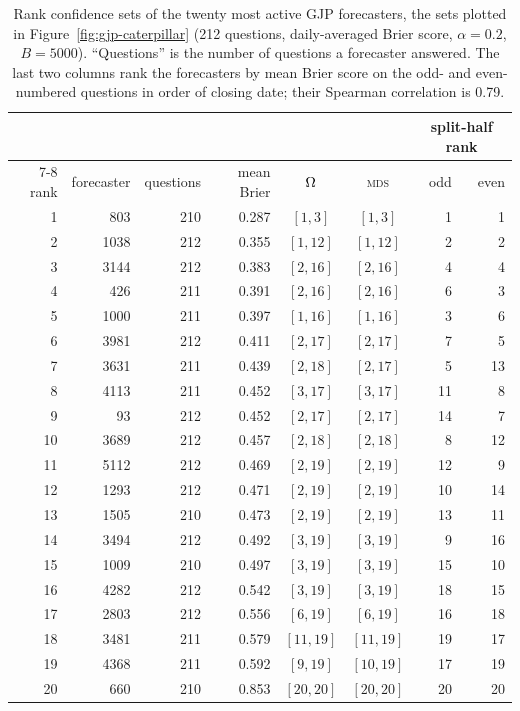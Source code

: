 \begin{table}[htb]
  \centering
  \caption[GJP: all rank sets]{Rank confidence sets of the twenty most active GJP forecasters, the sets plotted in Figure~\ref{fig:gjp-caterpillar} (212 questions, daily-averaged Brier score, $\alpha=0.2$, $B=5000$). ``Questions'' is the number of questions a forecaster answered. The last two columns rank the forecasters by mean Brier score on the odd- and even-numbered questions in order of closing date; their Spearman correlation is 0.79.}
  \label{tab:app-gjp}
  \small
  \begin{tabular}{rrrrccrr}
    \toprule
    & & & & & & \multicolumn{2}{c}{split-half rank}\\
    \cmidrule(lr){7-8}
    rank & forecaster & questions & mean Brier & $\Omega$ & \textsc{mds} & odd & even\\
    \midrule
    1 & 803 & 210 & 0.287 & $[1,3]$ & $[1,3]$ & 1 & 1\\
    2 & 1038 & 212 & 0.355 & $[1,12]$ & $[1,12]$ & 2 & 2\\
    3 & 3144 & 212 & 0.383 & $[2,16]$ & $[2,16]$ & 4 & 4\\
    4 & 426 & 211 & 0.391 & $[2,16]$ & $[2,16]$ & 6 & 3\\
    5 & 1000 & 211 & 0.397 & $[1,16]$ & $[1,16]$ & 3 & 6\\
    6 & 3981 & 212 & 0.411 & $[2,17]$ & $[2,17]$ & 7 & 5\\
    7 & 3631 & 211 & 0.439 & $[2,18]$ & $[2,17]$ & 5 & 13\\
    8 & 4113 & 211 & 0.452 & $[3,17]$ & $[3,17]$ & 11 & 8\\
    9 & 93 & 212 & 0.452 & $[2,17]$ & $[2,17]$ & 14 & 7\\
    10 & 3689 & 212 & 0.457 & $[2,18]$ & $[2,18]$ & 8 & 12\\
    11 & 5112 & 212 & 0.469 & $[2,19]$ & $[2,19]$ & 12 & 9\\
    12 & 1293 & 212 & 0.471 & $[2,19]$ & $[2,19]$ & 10 & 14\\
    13 & 1505 & 210 & 0.473 & $[2,19]$ & $[2,19]$ & 13 & 11\\
    14 & 3494 & 212 & 0.492 & $[3,19]$ & $[3,19]$ & 9 & 16\\
    15 & 1009 & 210 & 0.497 & $[3,19]$ & $[3,19]$ & 15 & 10\\
    16 & 4282 & 212 & 0.542 & $[3,19]$ & $[3,19]$ & 18 & 15\\
    17 & 2803 & 212 & 0.556 & $[6,19]$ & $[6,19]$ & 16 & 18\\
    18 & 3481 & 211 & 0.579 & $[11,19]$ & $[11,19]$ & 19 & 17\\
    19 & 4368 & 211 & 0.592 & $[9,19]$ & $[10,19]$ & 17 & 19\\
    20 & 660 & 210 & 0.853 & $[20,20]$ & $[20,20]$ & 20 & 20\\
    \bottomrule
  \end{tabular}
\end{table}
